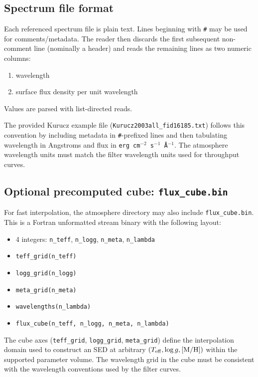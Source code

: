 \documentclass[linenumbers,apj,twocolumn, floatfix]{aastex701}
\begin{document}
\subsection{Spectrum file format}

Each referenced spectrum file is plain text. Lines beginning with \texttt{\#} may be used for comments/metadata. The reader then discards the first subsequent non-comment line (nominally a header) and reads the remaining lines as two numeric columns:
\begin{enumerate}
  \item wavelength
  \item surface flux density per unit wavelength
\end{enumerate}
Values are parsed with list-directed reads.

The provided Kurucz example file (\texttt{Kurucz2003all\_fid16185.txt}) follows this convention by including metadata in \texttt{\#}-prefixed lines and then tabulating wavelength in Angstroms and flux in \texttt{erg\,cm$^{-2}$\,s$^{-1}$\,\AA$^{-1}$}. The atmosphere wavelength units must match the filter wavelength units used for throughput curves.

\subsection{Optional precomputed cube: \texttt{flux\_cube.bin}}

For fast interpolation, the atmosphere directory may also include \texttt{flux\_cube.bin}. This is a Fortran unformatted stream binary with the following layout:

\begin{itemize}
  \item 4 integers: \texttt{n\_teff}, \texttt{n\_logg}, \texttt{n\_meta}, \texttt{n\_lambda}
  \item \texttt{teff\_grid(n\_teff)}
  \item \texttt{logg\_grid(n\_logg)}
  \item \texttt{meta\_grid(n\_meta)}
  \item \texttt{wavelengths(n\_lambda)}
  \item \texttt{flux\_cube(n\_teff, n\_logg, n\_meta, n\_lambda)}
\end{itemize}

The cube axes (\texttt{teff\_grid}, \texttt{logg\_grid}, \texttt{meta\_grid}) define the interpolation domain used to construct an SED at arbitrary $(T_{\rm eff}, \log g, \mathrm{[M/H]})$ within the supported parameter volume. The wavelength grid in the cube must be consistent with the wavelength conventions used by the filter curves.


{}

\end{document}
